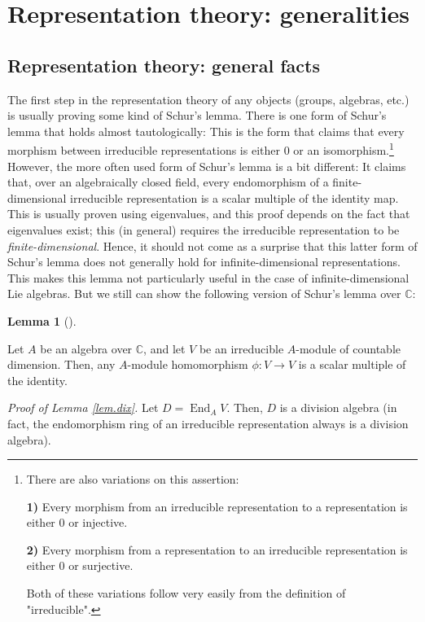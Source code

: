 \documentclass
[numbers=enddot,12pt,final,onecolumn,german,notitlepage]{scrartcl}%
\theoremstyle{definition}
\newtheorem{lem}[theo]{Lemma}
\newenvironment{lemma}[1][]
{\begin{lem}[#1]\begin{leftbar}}
{\end{leftbar}\end{lem}}
\begin{document}
\section{Representation theory: generalities}

\subsection{Representation theory: general facts}

The first step in the representation theory of any objects (groups, algebras,
etc.) is usually proving some kind of Schur's lemma. There is one form of
Schur's lemma that holds almost tautologically: This is the form that claims
that every morphism between irreducible representations is either $0$ or an
isomorphism.\footnote{There are also variations on this assertion:
\par
\textbf{1)} Every morphism from an irreducible representation to a
representation is either $0$ or injective.
\par
\textbf{2)} Every morphism from a representation to an irreducible
representation is either $0$ or surjective.
\par
Both of these variations follow very easily from the definition of
"irreducible".} However, the more often used form of Schur's lemma is a bit
different: It claims that, over an algebraically closed field, every
endomorphism of a finite-dimensional irreducible representation is a scalar
multiple of the identity map. This is usually proven using eigenvalues, and
this proof depends on the fact that eigenvalues exist; this (in general)
requires the irreducible representation to be \textit{finite-dimensional}.
Hence, it should not come as a surprise that this latter form of Schur's lemma
does not generally hold for infinite-dimensional representations. This makes
this lemma not particularly useful in the case of infinite-dimensional Lie
algebras. But we still can show the following version of Schur's lemma over
$\mathbb{C}$:

\begin{lemma}
[Dixmier's Lemma]\label{lem.dix}Let $A$ be an algebra over $\mathbb{C}$, and
let $V$ be an irreducible $A$-module of countable dimension. Then, any
$A$-module homomorphism $\phi:V\rightarrow V$ is a scalar multiple of the identity.
\end{lemma}

\textit{Proof of Lemma \ref{lem.dix}.} Let $D=\operatorname*{End}%
\nolimits_{A}V$. Then, $D$ is a division algebra (in fact, the endomorphism
ring of an irreducible representation always is a division algebra).
\end{document}
